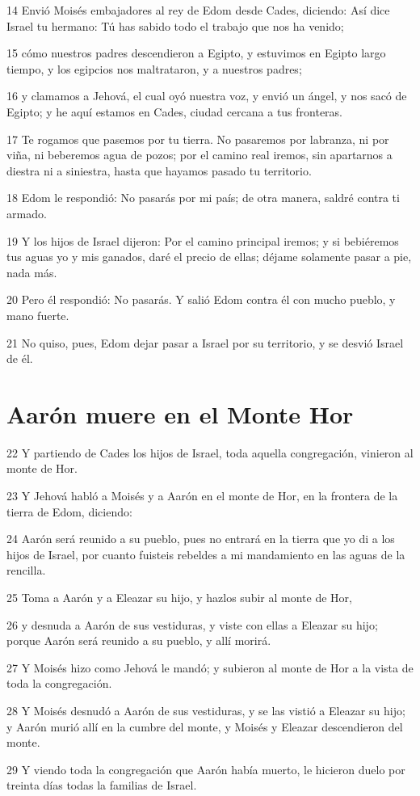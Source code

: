 \par 14 Envió Moisés embajadores al rey de Edom desde Cades, diciendo: Así dice Israel tu hermano: Tú has sabido todo el trabajo que nos ha venido;
\par 15 cómo nuestros padres descendieron a Egipto, y estuvimos en Egipto largo tiempo, y los egipcios nos maltrataron, y a nuestros padres;
\par 16 y clamamos a Jehová, el cual oyó nuestra voz, y envió un ángel, y nos sacó de Egipto; y he aquí estamos en Cades, ciudad cercana a tus fronteras.
\par 17 Te rogamos que pasemos por tu tierra. No pasaremos por labranza, ni por viña, ni beberemos agua de pozos; por el camino real iremos, sin apartarnos a diestra ni a siniestra, hasta que hayamos pasado tu territorio.
\par 18 Edom le respondió: No pasarás por mi país; de otra manera, saldré contra ti armado.
\par 19 Y los hijos de Israel dijeron: Por el camino principal iremos; y si bebiéremos tus aguas yo y mis ganados, daré el precio de ellas; déjame solamente pasar a pie, nada más.
\par 20 Pero él respondió: No pasarás. Y salió Edom contra él con mucho pueblo, y mano fuerte.
\par 21 No quiso, pues, Edom dejar pasar a Israel por su territorio, y se desvió Israel de él.

\section*{Aarón muere en el Monte Hor}

\par 22 Y partiendo de Cades los hijos de Israel, toda aquella congregación, vinieron al monte de Hor.
\par 23 Y Jehová habló a Moisés y a Aarón en el monte de Hor, en la frontera de la tierra de Edom, diciendo:
\par 24 Aarón será reunido a su pueblo, pues no entrará en la tierra que yo di a los hijos de Israel, por cuanto fuisteis rebeldes a mi mandamiento en las aguas de la rencilla.
\par 25 Toma a Aarón y a Eleazar su hijo, y hazlos subir al monte de Hor,
\par 26 y desnuda a Aarón de sus vestiduras, y viste con ellas a Eleazar su hijo; porque Aarón será reunido a su pueblo, y allí morirá.
\par 27 Y Moisés hizo como Jehová le mandó; y subieron al monte de Hor a la vista de toda la congregación.
\par 28 Y Moisés desnudó a Aarón de sus vestiduras, y se las vistió a Eleazar su hijo; y Aarón murió allí en la cumbre del monte, y Moisés y Eleazar descendieron del monte.
\par 29 Y viendo toda la congregación que Aarón había muerto, le hicieron duelo por treinta días todas la familias de Israel.


